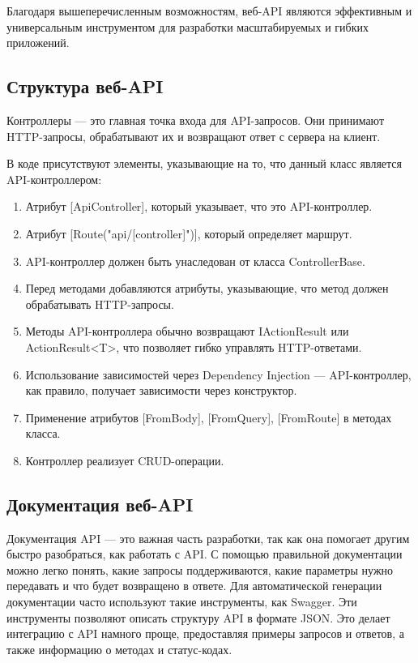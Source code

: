 \documentclass[a4paper,12pt]{report}
\begin{document}
Благодаря вышеперечисленным возможностям, веб-\ac{API} являются эффективным и 
универсальным инструментом для разработки масштабируемых и гибких приложений.


\subsection{Структура веб-\ac{API}}

Контроллеры –-- это главная точка входа для \ac{API}-запросов. Они принимают \ac{HTTP}-запросы, обрабатывают их и возвращают ответ с сервера на клиент.

В коде присутствуют элементы, указывающие на то, что данный класс является \ac{API}-контроллером:
\begin{enumerate}
  \item
      Атрибут [ApiController], который указывает, что это \ac{API}-контроллер.
  \item
      Атрибут [Route("api/[controller]")], который определяет маршрут.
  \item
      \ac{API}-контроллер должен быть унаследован от класса ControllerBase.
  \item
      Перед методами добавляются атрибуты, указывающие, что метод должен обрабатывать \ac{HTTP}-запросы.
  \item
      Методы \ac{API}-контроллера обычно возвращают IActionResult или ActionResult<T>, что позволяет гибко управлять \ac{HTTP}-ответами.
  \item
      Использование зависимостей через Dependency Injection --- \ac{API}-контроллер, как правило, получает зависимости через конструктор.
  \item
      Применение атрибутов [FromBody], [FromQuery], [FromRoute] в методах класса.
  \item
      Контроллер реализует \ac{CRUD}-операции.
\end{enumerate}

\subsection{Документация веб-\ac{API}}

Документация \ac{API} --- это важная часть разработки, так как она помогает другим 
быстро разобраться, как работать с \ac{API}. С помощью правильной документации можно легко понять, какие запросы поддерживаются, 
какие параметры нужно передавать и что будет возвращено в ответе. 
Для автоматической генерации документации часто используют такие инструменты, как Swagger. 
Эти инструменты позволяют описать структуру \ac{API} в формате \ac{JSON}. Это делает интеграцию с \ac{API} 
намного проще, предоставляя примеры запросов и ответов, а также информацию о методах и статус-кодах.
\end{document}
